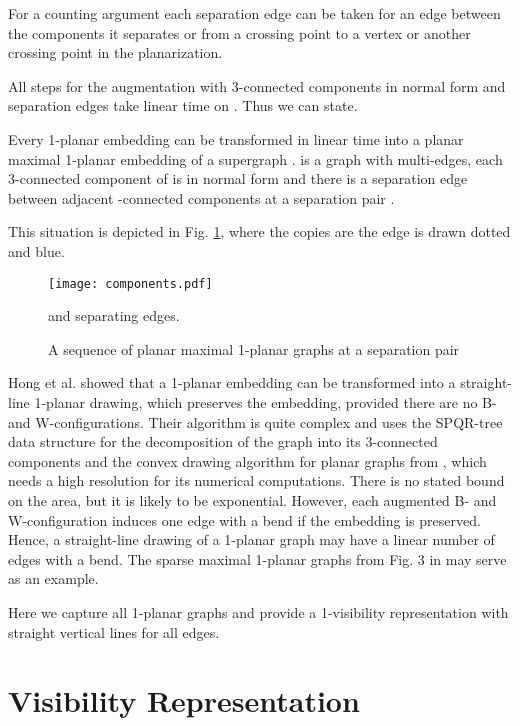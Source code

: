 \documentclass[runningheads]{llncs}
\begin{document}
For a counting argument each separation edge can be taken for an
edge between the components it separates or from a crossing point to
a  vertex or another crossing point in the planarization.

All steps for the augmentation with 3-connected components in normal
form and separation edges take linear time on . Thus
we can state.


\begin{lemma}
Every 1-planar embedding  can be transformed in
linear time into a planar maximal 1-planar embedding
 of a supergraph .  is a graph with
multi-edges, each 3-connected component of  is in
normal form and there is a separation edge between  adjacent
-connected components at a separation pair .
\end{lemma}


This situation is depicted in Fig. \ref{Fig:separation}, where the
copies are the edge  is drawn dotted and blue.


\begin{figure}
   \begin{center}
     \texttt{[image: components.pdf]}
     \caption{A sequence of planar maximal 1-planar graphs at a separation pair }
     and separating edges.
     \label{Fig:separation}
   \end{center}
\end{figure}


Hong et al. \cite{help-ft1pg-12} showed that a 1-planar embedding
can be transformed into a straight-line 1-planar drawing, which
preserves the embedding, provided there are no B- and
W-configurations. Their algorithm is quite complex and uses the
SPQR-tree data structure for the decomposition of the graph into its
3-connected components and the convex drawing algorithm for planar
graphs from \cite{cyn-lacdpg-84}, which needs a high resolution for
its numerical computations. There is no stated bound on the area,
but it is likely to be exponential. However, each augmented B- and
W-configuration induces one edge with a bend if the embedding is
preserved. Hence, a straight-line drawing of a 1-planar graph may
have a linear number of edges with a bend. The sparse maximal
1-planar graphs  from Fig. 3 in \cite{begghr-odm1p-13} may serve as
an example.


Here we capture all 1-planar graphs  and provide a 1-visibility
representation with straight vertical lines for all  edges.



\section{Visibility Representation}
\end{document}
